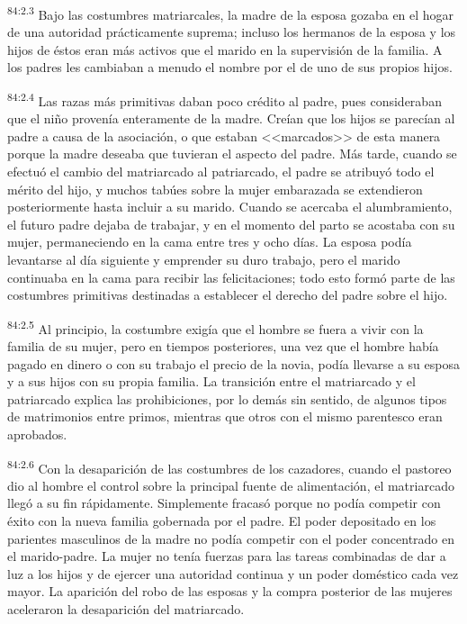 \documentclass[twoside, 11pt]{book}
\begin{document}
\par
\textsuperscript{84:2.3} Bajo las costumbres matriarcales, la madre de la esposa gozaba en el hogar de una autoridad prácticamente suprema; incluso los hermanos de la esposa y los hijos de éstos eran más activos que el marido en la supervisión de la familia. A los padres les cambiaban a menudo el nombre por el de uno de sus propios hijos.

\par
\textsuperscript{84:2.4} Las razas más primitivas daban poco crédito al padre, pues consideraban que el niño provenía enteramente de la madre. Creían que los hijos se parecían al padre a causa de la asociación, o que estaban <<marcados>> de esta manera porque la madre deseaba que tuvieran el aspecto del padre. Más tarde, cuando se efectuó el cambio del matriarcado al patriarcado, el padre se atribuyó todo el mérito del hijo, y muchos tabúes sobre la mujer embarazada se extendieron posteriormente hasta incluir a su marido. Cuando se acercaba el alumbramiento, el futuro padre dejaba de trabajar, y en el momento del parto se acostaba con su mujer, permaneciendo en la cama entre tres y ocho días. La esposa podía levantarse al día siguiente y emprender su duro trabajo, pero el marido continuaba en la cama para recibir las felicitaciones; todo esto formó parte de las costumbres primitivas destinadas a establecer el derecho del padre sobre el hijo.

\par
\textsuperscript{84:2.5} Al principio, la costumbre exigía que el hombre se fuera a vivir con la familia de su mujer, pero en tiempos posteriores, una vez que el hombre había pagado en dinero o con su trabajo el precio de la novia, podía llevarse a su esposa y a sus hijos con su propia familia. La transición entre el matriarcado y el patriarcado explica las prohibiciones, por lo demás sin sentido, de algunos tipos de matrimonios entre primos, mientras que otros con el mismo parentesco eran aprobados.

\par
\textsuperscript{84:2.6} Con la desaparición de las costumbres de los cazadores, cuando el pastoreo dio al hombre el control sobre la principal fuente de alimentación, el matriarcado llegó a su fin rápidamente. Simplemente fracasó porque no podía competir con éxito con la nueva familia gobernada por el padre. El poder depositado en los parientes masculinos de la madre no podía competir con el poder concentrado en el marido-padre. La mujer no tenía fuerzas para las tareas combinadas de dar a luz a los hijos y de ejercer una autoridad continua y un poder doméstico cada vez mayor. La aparición del robo de las esposas y la compra posterior de las mujeres aceleraron la desaparición del matriarcado.
\end{document}
